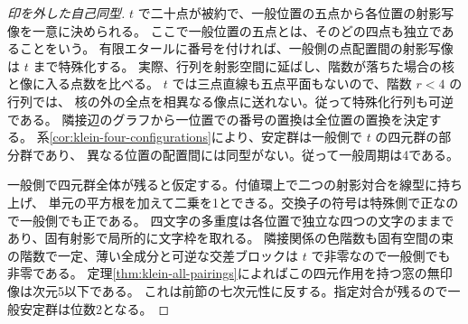 \begin{proof}[印を外した自己同型]
$t$ で二十点が被約で、一般位置の五点から各位置の射影写像を一意に決められる。
ここで一般位置の五点とは、そのどの四点も独立であることをいう。
有限エタールに番号を付ければ、一般側の点配置間の射影写像は $t$ まで特殊化する。
実際、行列を射影空間に延ばし、階数が落ちた場合の核と像に入る点数を比べる。
$t$ では三点直線も五点平面もないので、階数 $r<4$ の行列では、
核の外の全点を相異なる像点に送れない。従って特殊化行列も可逆である。
隣接辺のグラフから一位置での番号の置換は全位置の置換を決定する。
系\ref{cor:klein-four-configurations}により、安定群は一般側で $t$ の四元群の部分群であり、
異なる位置の配置間には同型がない。従って一般周期は4である。

一般側で四元群全体が残ると仮定する。付値環上で二つの射影対合を線型に持ち上げ、
単元の平方根を加えて二乗を1とできる。交換子の符号は特殊側で正なので一般側でも正である。
四文字の多重度は各位置で独立な四つの文字のままであり、固有射影で局所的に文字枠を取れる。
隣接関係の色階数も固有空間の束の階数で一定、薄い全成分と可逆な交差ブロックは
$t$ で非零なので一般側でも非零である。
定理\ref{thm:klein-all-pairings}によればこの四元作用を持つ窓の無印像は次元5以下である。
これは前節の七次元性に反する。指定対合が残るので一般安定群は位数2となる。
\end{proof}
